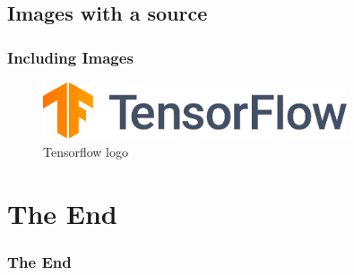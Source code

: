 \documentclass{beamer}
\begin{document}
\subsection{Images with a source}
\begin{frame}
	\frametitle{Including Images}
	\begin{figure}
		\centering
		\includegraphics[width=0.8\textwidth]{images/tensorflow.pdf}
		\caption{Tensorflow logo}
	\end{figure}
\end{frame}


\section{The End}
\begin{frame}
	\frametitle{The End}
\end{frame}
\end{document}
